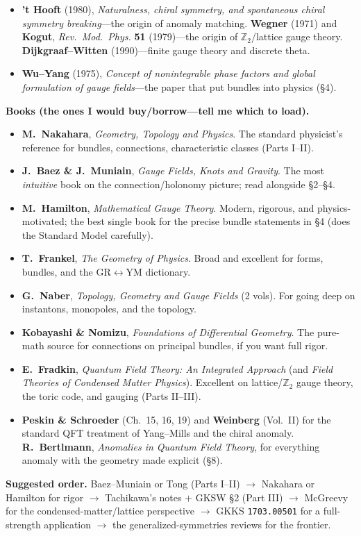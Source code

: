 \documentclass[11pt]{article}
\newcommand{\Ztwo}{\mathbb{Z}_2}
\begin{document}
\begin{itemize}
\texttt{arXiv:2307.07547}; and \textbf{Sharpe}, \emph{Notes on generalized global
symmetries}, \texttt{arXiv:1508.04770}. For the road past these notes.
\item \textbf{'t Hooft} (1980), \emph{Naturalness, chiral symmetry, and spontaneous
chiral symmetry breaking}---the origin of anomaly matching. \textbf{Wegner} (1971) and
\textbf{Kogut}, \emph{Rev.\ Mod.\ Phys.} \textbf{51} (1979)---the origin of
$\Ztwo$/lattice gauge theory. \textbf{Dijkgraaf--Witten} (1990)---finite gauge theory
and discrete theta.
\item \textbf{Wu--Yang} (1975), \emph{Concept of nonintegrable phase factors and global
formulation of gauge fields}---the paper that put bundles into physics (\S4).
\end{itemize}

\medskip
\noindent\textbf{Books (the ones I would buy/borrow---tell me which to load).}
\begin{itemize}\setlength{\itemsep}{2pt}
\item \textbf{M.\ Nakahara}, \emph{Geometry, Topology and Physics}. The standard
physicist's reference for bundles, connections, characteristic classes (Parts I--II).
\item \textbf{J.\ Baez \& J.\ Muniain}, \emph{Gauge Fields, Knots and Gravity}. The most
\emph{intuitive} book on the connection/holonomy picture; read alongside \S2--\S4.
\item \textbf{M.\ Hamilton}, \emph{Mathematical Gauge Theory}. Modern, rigorous, and
physics-motivated; the best single book for the precise bundle statements in \S4 (does
the Standard Model carefully).
\item \textbf{T.\ Frankel}, \emph{The Geometry of Physics}. Broad and excellent for
forms, bundles, and the GR$\leftrightarrow$YM dictionary.
\item \textbf{G.\ Naber}, \emph{Topology, Geometry and Gauge Fields} (2 vols). For going
deep on instantons, monopoles, and the topology.
\item \textbf{Kobayashi \& Nomizu}, \emph{Foundations of Differential Geometry}. The
pure-math source for connections on principal bundles, if you want full rigor.
\item \textbf{E.\ Fradkin}, \emph{Quantum Field Theory: An Integrated Approach} (and
\emph{Field Theories of Condensed Matter Physics}). Excellent on lattice/$\Ztwo$ gauge
theory, the toric code, and gauging (Parts II--III).
\item \textbf{Peskin \& Schroeder} (Ch.\ 15, 16, 19) and \textbf{Weinberg} (Vol.\ II)
for the standard QFT treatment of Yang--Mills and the chiral anomaly. \textbf{R.\
Bertlmann}, \emph{Anomalies in Quantum Field Theory}, for everything anomaly with the
geometry made explicit (\S8).
\end{itemize}

\medskip
\noindent\textbf{Suggested order.} Baez--Muniain or Tong (Parts I--II) $\to$ Nakahara or
Hamilton for rigor $\to$ Tachikawa's notes $+$ GKSW \S2 (Part III) $\to$ McGreevy for the
condensed-matter/lattice perspective $\to$ GKKS \texttt{1703.00501} for a full-strength
application $\to$ the generalized-symmetries reviews for the frontier.
\end{document}
